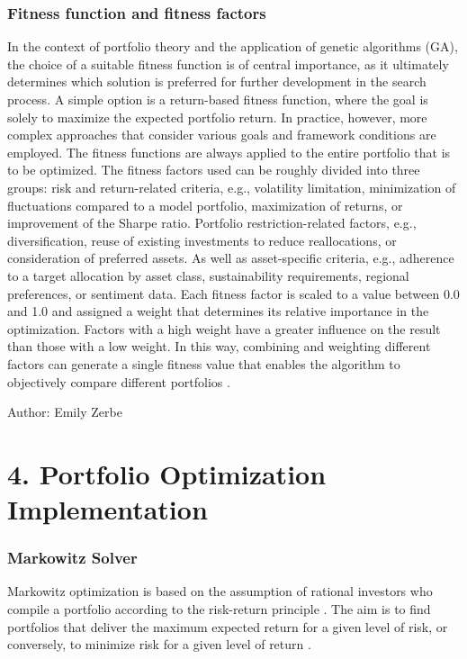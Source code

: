 \documentclass{agasthesis}
\begin{document}
\subsection{Fitness function and fitness factors}
In the context of portfolio theory and the application of genetic algorithms (GA), the choice of a suitable fitness function is of central importance, 
as it ultimately determines which solution is preferred for further development in the search process. A simple option is a return-based fitness function, 
where the goal is solely to maximize the expected portfolio return. In practice, however, more complex approaches that consider various goals and framework 
conditions are employed. The fitness functions are always applied to the entire portfolio that is to be optimized. The fitness factors used can be roughly divided 
into three groups: risk and return-related criteria, e.g., volatility limitation, minimization of fluctuations compared to a model portfolio, maximization of returns, 
or improvement of the Sharpe ratio. Portfolio restriction-related factors, e.g., diversification, reuse of existing investments to reduce reallocations, or consideration 
of preferred assets. As well as asset-specific criteria, e.g., adherence to a target allocation by asset class, sustainability requirements, regional preferences, or sentiment data. 
Each fitness factor is scaled to a value between 0.0 and 1.0 and assigned a weight that determines its relative importance in the optimization. Factors with a high weight have a greater 
influence on the result than those with a low weight. In this way, combining and weighting different factors can generate a single fitness value that enables the algorithm to objectively 
compare different portfolios \cite[p. 206-207]{soldatos_big_2022}.

Author: Emily Zerbe
\chapter{4.	Portfolio Optimization Implementation}
\subsection{Markowitz Solver}
Markowitz optimization is based on the assumption of rational investors who compile a portfolio according to the risk-return principle \cite{mangram_simplified_2013}. 
The aim is to find portfolios that deliver the maximum expected return for a given level of risk, or conversely, to minimize risk for a given level of 
return \cite[p. 77-91]{markowitz_portfolio_1952}.
\end{document}
